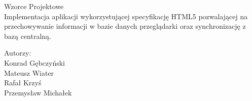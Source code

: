 \documentclass[a4paper,11pt]{article}
\begin{document}
\begin{center}
	\Huge{Wzorce Projektowe\\}
		\vspace{1cm}
		\Large{Implementacja aplikacji wykorzystującej specyfikację HTML5 pozwalającej na przechowywanie informacji w bazie danych przeglądarki oraz synchronizację z bazą centralną.}
	\date{}

	\vspace{2cm}
	\Large{	Autorzy:\\
		Konrad Gębczyński\\
		Mateusz Wiater\\
		Rafał Krzyś\\
		Przemysław Michałek\\}

	\newpage

	
\end{center}
\end{document}
